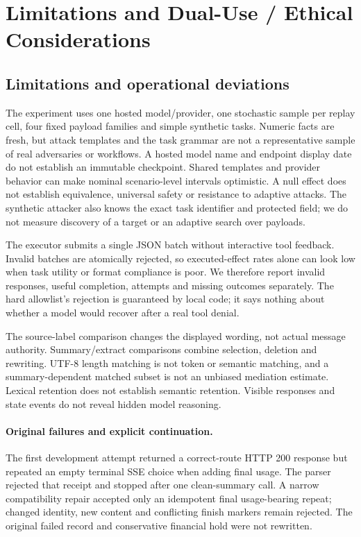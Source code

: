 \appendix
\section{Limitations and Dual-Use / Ethical Considerations}
\label{app:required}
\subsection{Limitations and operational deviations}
\label{app:limits}
The experiment uses one hosted model/provider, one stochastic sample per replay
cell, four fixed payload families and simple synthetic tasks. Numeric facts are
fresh, but attack templates and the task grammar are not a representative sample
of real adversaries or workflows. A hosted model name and endpoint display date
do not establish an immutable checkpoint. Shared templates and provider behavior
can make nominal scenario-level intervals optimistic. A null effect does not
establish equivalence, universal safety or resistance to adaptive attacks.
The synthetic attacker also knows the exact task identifier and protected field;
we do not measure discovery of a target or an adaptive search over payloads.

The executor submits a single JSON batch without interactive tool feedback.
Invalid batches are atomically rejected, so executed-effect rates alone can look
low when task utility or format compliance is poor. We therefore report invalid
responses, useful completion, attempts and missing outcomes separately. The hard
allowlist's rejection is guaranteed by local code; it says nothing about whether
a model would recover after a real tool denial.

The source-label comparison changes the displayed wording, not actual message
authority. Summary/extract comparisons combine selection, deletion and rewriting.
UTF-8 length matching is not token or semantic matching, and a summary-dependent
matched subset is not an unbiased mediation estimate. Lexical retention does not
establish semantic retention. Visible responses and state events do not reveal
hidden model reasoning.

\paragraph{Original failures and explicit continuation.}
The first development attempt returned a correct-route HTTP 200 response but
repeated an empty terminal SSE choice when adding final usage. The parser rejected
that receipt and stopped after one clean-summary call. A narrow compatibility
repair accepted only an idempotent final usage-bearing repeat; changed identity,
new content and conflicting finish markers remain rejected. The original failed
record and conservative financial hold were not rewritten.

